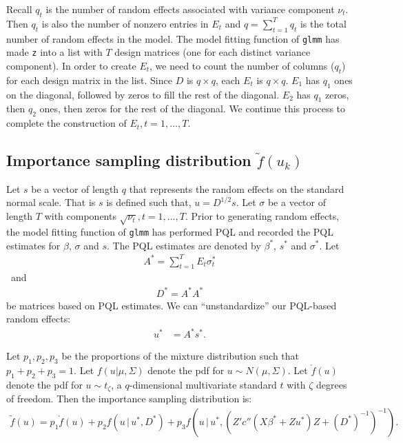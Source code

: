 \documentclass{article}
\begin{document}
Recall $q_t$ is the number of random effects associated with variance component $\nu_t$. Then $q_t$ is also the number of nonzero entries in $E_t$ and $q=\sum_{t=1}^T q_t$ is the total number of random effects in the model.  
The model fitting function of \texttt{glmm} has made  \texttt{z} into a list with $T$ design matrices (one for each distinct variance component).  In order to create $E_t$, we need to  count the  number of columns ($q_t$) for each design matrix in the list.
Since $D$  is $q \times q$, each $E_t$  is $q \times q$.   $E_1$ has $q_1$ ones on the diagonal, followed by zeros to fill the rest of the diagonal.  $E_2$ has $q_1$ zeros, then $q_2$ ones, then zeros for the rest of the diagonal. We continue this process to complete the construction of $E_t, t=1,\ldots, T$.

\subsection{Importance sampling distribution $\tilde{f}(u_k)$}\label{sec:ftwiddle}
 Let $s$ be a vector of length $q$ that represents the random effects on the standard normal scale. That is $s$ is defined such that, $u= D^{1/2}s$. Let $\sigma$ be a vector of length $T$ with components $\sqrt{\nu_t},t=1,\ldots,T$.  Prior to generating random effects, the model fitting function of \texttt{glmm} has performed PQL and recorded the PQL estimates for $\beta$, $\sigma$ and  $s$. The PQL estimates are denoted by $\beta^*$, $s^*$ and $\sigma^*$. Let
\begin{align}
A^*=\sum_{t=1}^T E_t \sigma^*_t
\end{align}\
and
\begin{align}
 D^* =A^*A^*
\end{align}
be matrices based on PQL estimates. We can ``unstandardize'' our PQL-based random effects:
\begin{align}
u^*&=A^*s^*.
\end{align}


Let $p_1,p_2,p_3$ be the proportions of the mixture distribution such that  $p_1+p_2+p_3=1$.  Let $f(u|\mu,\Sigma)$ denote the pdf for $u \sim N(\mu,\Sigma)$.  Let $\grave{f}(u)$ denote the pdf for $u \sim t_\zeta$, a $q$-dimensional multivariate standard $t$ with $\zeta$ degrees of freedom. Then the importance sampling distribution is:
\begin{align}
 \tilde{f}(u) = p_1  \grave{f}(u)+p_2  f(u \, | \, u^*, D^*)+p_3  f(u \, | \, u^*, (Z'  c''(X \beta^*+Zu^*) Z +(D^*)^{-1}   )^{-1}). \label{eq:ftwiddle}
\end{align}
\end{document}
